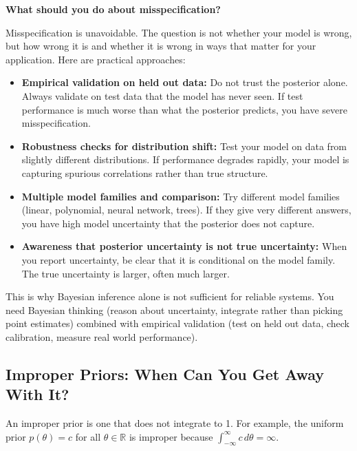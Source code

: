 \vspace{1.5em}

\textbf{What should you do about misspecification?}

Misspecification is unavoidable. The question is not whether your model is wrong, but how wrong it is and whether it is wrong in ways that matter for your application. Here are practical approaches:

\begin{itemize}
\item \textbf{Empirical validation on held out data:} Do not trust the posterior alone. Always validate on test data that the model has never seen. If test performance is much worse than what the posterior predicts, you have severe misspecification.

\item \textbf{Robustness checks for distribution shift:} Test your model on data from slightly different distributions. If performance degrades rapidly, your model is capturing spurious correlations rather than true structure.

\item \textbf{Multiple model families and comparison:} Try different model families (linear, polynomial, neural network, trees). If they give very different answers, you have high model uncertainty that the posterior does not capture.

\item \textbf{Awareness that posterior uncertainty is not true uncertainty:} When you report uncertainty, be clear that it is conditional on the model family. The true uncertainty is larger, often much larger.
\end{itemize}

This is why Bayesian inference alone is not sufficient for reliable systems. You need Bayesian thinking (reason about uncertainty, integrate rather than picking point estimates) combined with empirical validation (test on held out data, check calibration, measure real world performance).

\subsection{Improper Priors: When Can You Get Away With It?}

An improper prior is one that does not integrate to 1. For example, the uniform prior $p(\theta) = c$ for all $\theta \in \mathbb{R}$ is improper because $\int_{-\infty}^{\infty} c \, d\theta = \infty$.

